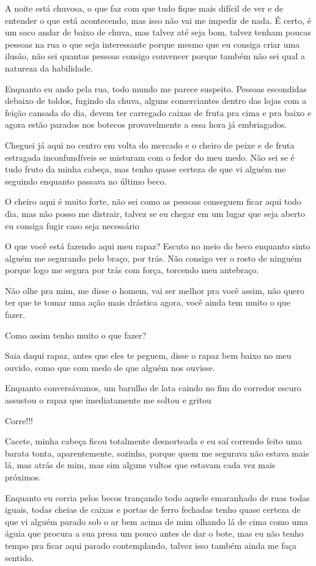 A noite está chuvosa, o que faz com que tudo fique mais difícil de ver e de entender o que está acontecendo, mas isso não vai me impedir de nada. É certo, é um saco andar de baixo de chuva, mas talvez até seja bom, talvez tenham poucas pessoas na rua o que seja interessante porque mesmo que eu consiga criar uma ilusão, não sei quantas pessoas consigo convencer porque também não sei qual a natureza da habilidade.

Enquanto eu ando pela rua, todo mundo me parece suspeito. Pessoas escondidas debaixo de toldos, fugindo da chuva, alguns comerciantes dentro das lojas com a feição cansada do dia, devem ter carregado caixas de fruta pra cima e pra baixo e agora estão parados nos botecos provavelmente a essa hora já embriagados.

Cheguei já aqui no centro em volta do mercado e o cheiro de peixe e de fruta estragada inconfundíveis se misturam com o fedor do meu medo. Não sei se é tudo fruto da minha cabeça, mas tenho quase certeza de que vi alguém me seguindo enquanto passava no último beco.

O cheiro aqui é muito forte, não sei como as pessoas conseguem ficar aqui todo dia, mas não posso me distrair, talvez se eu chegar em um lugar que seja aberto eu consiga fugir caso seja necessário

O que você está fazendo aqui meu rapaz? Escuto no meio do beco enquanto sinto alguém me segurando pelo braço, por trás. Não consigo ver o rosto de ninguém porque logo me segura por trás com força, torcendo meu antebraço.

Não olhe pra mim, me disse o homem, vai ser melhor pra você assim, não quero ter que te tomar uma ação mais drástica agora, você ainda tem muito o que fazer.

Como assim tenho muito o que fazer?

Saia daqui rapaz, antes que eles te peguem, disse o rapaz bem baixo no meu ouvido, como que com medo de que alguém nos ouvisse.

Enquanto conversávamos, um barulho de lata caindo no fim do corredor escuro assustou o rapaz que imediatamente me soltou e gritou

Corre!!!

Cacete, minha cabeça ficou totalmente desnorteada e eu saí correndo feito uma barata tonta, aparentemente, sozinho, porque quem me segurava não estava mais lá, mas atrás de mim, mas sim alguns vultos que estavam cada vez mais próximos.

Enquanto eu corria pelos becos trançando todo aquele emaranhado de ruas todas iguais, todas cheias de caixas e portas de ferro fechadas tenho quase certeza de que vi alguém parado sob o ar bem acima de mim olhando lá de cima como uma águia que procura a sua presa um pouco antes de dar o bote, mas eu não tenho tempo pra ficar aqui parado contemplando, talvez isso também ainda me faça sentido.

